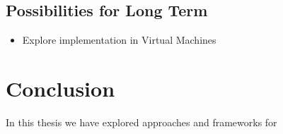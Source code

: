 \subsection{Possibilities for Long Term}
\label{sec:longterm}

\begin{itemize}
	\item Explore implementation in Virtual Machines
\end{itemize}

\section{Conclusion}
\label{sec:conclusion}

In this thesis we have explored approaches and frameworks for 